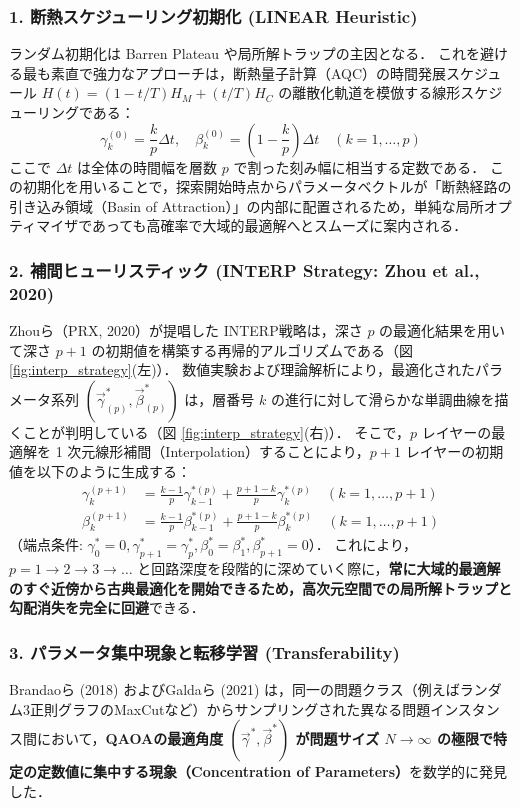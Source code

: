 \documentclass[11pt,a4paper,oneside,openany]{ltjsbook}
\theoremstyle{definition}
\theoremstyle{plain}
\theoremstyle{remark}
\begin{document}
\subsubsection*{1. 断熱スケジューリング初期化 (LINEAR Heuristic)}
ランダム初期化は Barren Plateau や局所解トラップの主因となる．
これを避ける最も素直で強力なアプローチは，断熱量子計算（AQC）の時間発展スケジュール $H(t) = (1 - t/T)H_M + (t/T)H_C$ の離散化軌道を模倣する線形スケジューリングである：
\begin{equation}
    \gamma_k^{(0)} = \frac{k}{p} \Delta t, \quad \beta_k^{(0)} = \left(1 - \frac{k}{p}\right) \Delta t \quad (k = 1, \dots, p)
\end{equation}
ここで $\Delta t$ は全体の時間幅を層数 $p$ で割った刻み幅に相当する定数である．
この初期化を用いることで，探索開始時点からパラメータベクトルが「断熱経路の引き込み領域（Basin of Attraction）」の内部に配置されるため，単純な局所オプティマイザであっても高確率で大域的最適解へとスムーズに案内される．

\subsubsection*{2. 補間ヒューリスティック (INTERP Strategy: Zhou et al., 2020) \cite{zhou2020quantum}}
Zhouら（PRX, 2020）が提唱した INTERP戦略は，深さ $p$ の最適化結果を用いて深さ $p+1$ の初期値を構築する再帰的アルゴリズムである（図 \ref{fig:interp_strategy}(左)）．
数値実験および理論解析により，最適化されたパラメータ系列 $(\vec{\gamma}_{(p)}^*, \vec{\beta}_{(p)}^*)$ は，層番号 $k$ の進行に対して滑らかな単調曲線を描くことが判明している（図 \ref{fig:interp_strategy}(右)）．
そこで，$p$ レイヤーの最適解を 1 次元線形補間（Interpolation）することにより，$p+1$ レイヤーの初期値を以下のように生成する：
\begin{align}
    \gamma_{k}^{(p+1)} &= \frac{k-1}{p} \gamma_{k-1}^{*(p)} + \frac{p+1-k}{p} \gamma_{k}^{*(p)} \quad (k = 1, \dots, p+1) \label{eq:interp} \\
    \beta_{k}^{(p+1)} &= \frac{k-1}{p} \beta_{k-1}^{*(p)} + \frac{p+1-k}{p} \beta_{k}^{*(p)} \quad (k = 1, \dots, p+1)
\end{align}
（端点条件: $\gamma_0^* = 0, \gamma_{p+1}^* = \gamma_p^*, \beta_0^* = \beta_1^*, \beta_{p+1}^* = 0$）．
これにより，$p=1 \to 2 \to 3 \to \dots$ と回路深度を段階的に深めていく際に，\textbf{常に大域的最適解のすぐ近傍から古典最適化を開始できるため，高次元空間での局所解トラップと勾配消失を完全に回避}できる．

\subsubsection*{3. パラメータ集中現象と転移学習 (Transferability) \cite{brandao2018fixed,galda2021transferability,egger2021warm}}
Brandaoら (2018)\cite{brandao2018fixed} およびGaldaら (2021)\cite{galda2021transferability} は，同一の問題クラス（例えばランダム3正則グラフのMaxCutなど）からサンプリングされた異なる問題インスタンス間において，\textbf{QAOAの最適角度 $(\vec{\gamma}^*, \vec{\beta}^*)$ が問題サイズ $N \to \infty$ の極限で特定の定数値に集中する現象（Concentration of Parameters）}を数学的に発見した．
\end{document}
